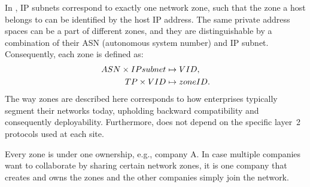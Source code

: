 In \name, IP subnets correspond to exactly one network zone, such that the zone
a host belongs to can be identified by the host IP address. The same private
address spaces can be a part of different zones, and they are distinguishable by a
combination of their ASN (autonomous system number) and IP subnet. 
Consequently, each zone is defined as:
\noindent 
\begin{subequations}
\begin{align}
ASN \times IPsubnet & \mapsto VID, \\
TP \times VID & \mapsto zoneID.
\end{align}
\label{eq:zoning}
\end{subequations}
\noindent 
The way zones are described here corresponds to how enterprises typically
segment their networks today, upholding backward compatibility and consequently
deployability. Furthermore, \name does not depend on the specific layer~2 protocols used 
at each site. 

Every zone is under one ownership, e.g., company A. In case multiple companies
want to collaborate by sharing certain network zones, it is one company that 
creates and owns the zones and the other companies simply join the network.

